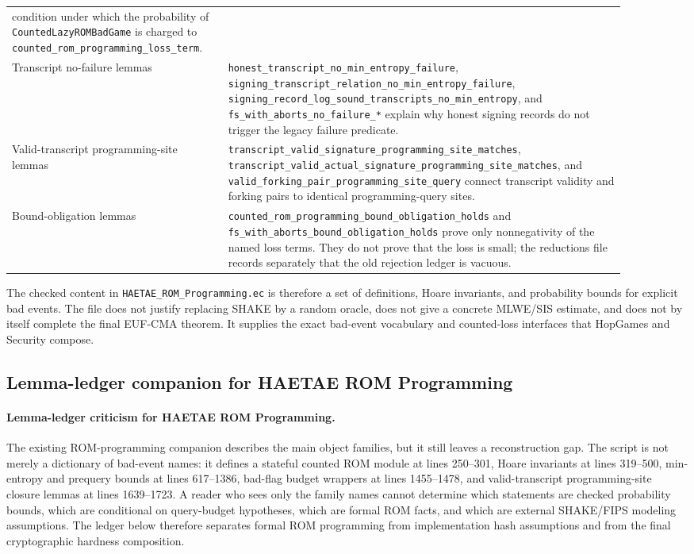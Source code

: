 \documentclass[11pt]{report}
\DeclareRobustCommand{\file}[1]{\ifmmode\text{\nolinkurl{#1}}\else\nolinkurl{#1}\fi}
\DeclareRobustCommand{\ec}[1]{\ifmmode\text{\nolinkurl{#1}}\else\nolinkurl{#1}\fi}
\theoremstyle{definition}
\theoremstyle{plain}
\begin{document}
\begin{longtable}{p{0.30\linewidth}p{0.60\linewidth}}
condition under which the probability of \ec{CountedLazyROMBadGame} is charged
to \ec{counted\_rom\_programming\_loss\_term}. \\
Transcript no-failure lemmas &
\ec{honest\_transcript\_no\_min\_entropy\_failure},
\ec{signing\_transcript\_relation\_no\_min\_entropy\_failure},
\ec{signing\_record\_log\_sound\_transcripts\_no\_min\_entropy}, and
\ec{fs\_with\_aborts\_no\_failure\_*} explain why honest signing records do not
trigger the legacy failure predicate. \\
Valid-transcript programming-site lemmas &
\ec{transcript\_valid\_signature\_programming\_site\_matches},
\ec{transcript\_valid\_actual\_signature\_programming\_site\_matches}, and
\ec{valid\_forking\_pair\_programming\_site\_query} connect transcript validity
and forking pairs to identical programming-query sites. \\
Bound-obligation lemmas &
\ec{counted\_rom\_programming\_bound\_obligation\_holds} and
\ec{fs\_with\_aborts\_bound\_obligation\_holds} prove only nonnegativity of
the named loss terms.  They do not prove that the loss is small; the reductions
file records separately that the old rejection ledger is vacuous. \\
\bottomrule
\end{longtable}

The checked content in \file{HAETAE\_ROM\_Programming.ec} is therefore a set of
definitions, Hoare invariants, and probability bounds for explicit bad events.
The file does not justify replacing SHAKE by a random oracle, does not give a
concrete MLWE/SIS estimate, and does not by itself complete the final
EUF-CMA theorem.  It supplies the exact bad-event vocabulary and counted-loss
interfaces that HopGames and Security compose.

\subsection{Lemma-ledger companion for HAETAE ROM Programming}

\paragraph{Lemma-ledger criticism for HAETAE ROM Programming.}
The existing ROM-programming companion describes the main object families, but
it still leaves a reconstruction gap.  The script is not merely a dictionary of
bad-event names: it defines a stateful counted ROM module at lines 250--301,
Hoare invariants at lines 319--500, min-entropy and prequery bounds at
lines 617--1386, bad-flag budget wrappers at lines 1455--1478, and
valid-transcript programming-site closure lemmas at lines 1639--1723.  A reader
who sees only the family names cannot determine which statements are checked
probability bounds, which are conditional on query-budget hypotheses, which are
formal ROM facts, and which are external SHAKE/FIPS modeling assumptions.  The
ledger below therefore separates formal ROM programming from implementation
hash assumptions and from the final cryptographic hardness composition.
\end{document}
